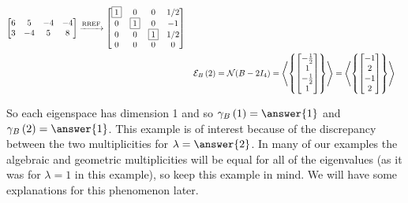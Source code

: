 \documentclass{ximera}
\begin{document}
\begin{example}
\begin{align*}
\begin{bmatrix}
                         6 & 5 & -4 & -4\\
                         3 & -4 & 5 & 8
                       \end{bmatrix}
                                      \xrightarrow{\text{RREF}}
                                      \begin{bmatrix}
                                        \fbox{1} & 0 & 0 & 1/2\\
                                        0 & \fbox{1} & 0 & -1\\
                                        0 & 0 & \fbox{1} & 1/2\\
                                        0 & 0 & 0 & 0
                                      \end{bmatrix}\\
           &&\mathcal{E}_{B}\left(2\right)&=\mathcal{N}\!\left(B-2I_4\right)
                                =\left\langle\left\{\begin{bmatrix}-\frac{1}{2}\\1\\-\frac{1}{2}\\1\end{bmatrix}\right\}\right\rangle
    =\left\langle\left\{\begin{bmatrix}-1\\2\\-1\\2\end{bmatrix}\right\}\right\rangle\\
  \end{align*}
  
  So each eigenspace has dimension 1 and so
  $\geomult{B}{1}=\answer{1}$ and $\geomult{B}{2}=\answer{1}$.  This
  example is of interest because of the discrepancy between the two
  multiplicities for $\lambda=\answer{2}$.  In many of our examples
  the algebraic and geometric multiplicities will be equal for all of
  the eigenvalues (as it was for $\lambda=1$ in this example), so keep
  this example in mind.  We will have some explanations for this
  phenomenon later.
\end{example}
\end{document}
